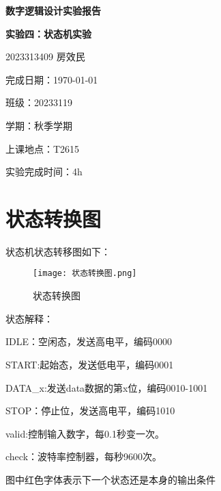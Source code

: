 \documentclass{article}
\begin{document}
\begin{titlepage}
    \centering
    \vspace*{1.5cm}
    {\Huge\bfseries{数字逻辑设计实验报告}\par}
    \vspace{5cm}
    {\Large\bfseries{实验四：状态机实验}\par}
    \vspace{2cm}
    {\Large{2023313409 房效民}\par}
    \vspace{0.5cm}
    {\Large{完成日期：\today}\par}
    \vspace{0.5cm}
    {\Large{班级：20233119}\par}
    \vspace{0.5cm}
    {\Large{学期：秋季学期}\par}
    \vspace{0.5cm}
    {\Large{上课地点：T2615}\par}
    \vspace{0.5cm}
    {\Large{实验完成时间：4h}\par}
    \vspace{2cm}
\end{titlepage}


\newpage
\tableofcontents
\newpage


\section{\textbf{状态转换图}}
状态机状态转移图如下：\par
\begin{figure}[htbp]%
    \centering %
    \texttt{[image: 状态转换图.png]} %
    \caption{状态转换图} %
\end{figure}

\vspace{3cm}
状态解释：\par
IDLE：空闲态，发送高电平，编码0000\par
START:起始态，发送低电平，编码0001\par
DATA\_x:发送data数据的第x位，编码0010-1001\par
STOP：停止位，发送高电平，编码1010\par
valid:控制输入数字，每0.1秒变一次。\par
check：波特率控制器，每秒9600次。\par
{\color{red}图中红色字体表示下一个状态还是本身的输出条件}\par
\end{document}
